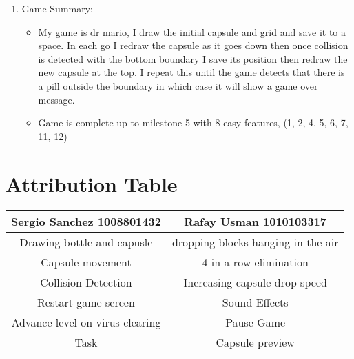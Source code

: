 \documentclass{article}
\begin{document}
\begin{enumerate}
\item Game Summary:
\begin{itemize}
\item
My game is dr mario, I draw the initial capsule and grid and save it to a space. In each go I redraw the capsule as it goes down then once collision is detected with the bottom boundary I save its position then redraw the new capsule at the top. I repeat this until the game detects that there is a pill outside the boundary in which case it will show a game over message.
\item
Game is complete up to milestone 5 with 8 easy features, (1, 2, 4, 5, 6, 7, 11, 12) 

\end{itemize}

    
\end{enumerate}

\section{Attribution Table}

\begin{center}
\begin{tabular}{|| c | c ||}
\hline
 Sergio Sanchez 1008801432 &  Rafay Usman 1010103317 \\ 
 \hline
 Drawing bottle and capusle & dropping blocks hanging in the air\\
 \hline
 Capsule movement & 4 in a row elimination\\
 \hline
 Collision Detection & Increasing capsule drop speed\\ 
 \hline
 Restart game screen & Sound Effects\\ 
 \hline
 Advance level on virus clearing & Pause Game\\
 \hline
 Task & Capsule preview\\  
 \hline
\end{tabular}
\end{center}

\end{document}
